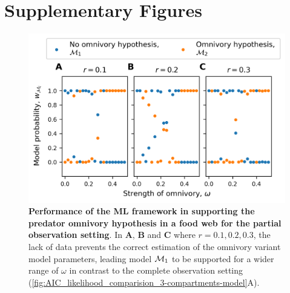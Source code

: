 \section{Supplementary Figures}
\begin{figure}[ht]
    \centering
    \includegraphics[]{figures/SI/figure5_2sp.png}
    \caption{\textbf{Performance of the ML framework in supporting the predator omnivory hypothesis in a food web for the partial observation setting}. 
    In \textbf{A},  \textbf{B} and \textbf{C} where $r = 0.1, 0.2 ,0.3$, the lack of data prevents the correct estimation of the omnivory variant model parameters, leading model $\mathcal{M}_1$ to be supported for a wider range of $\omega$ in contrast to the complete observation setting (\cref{fig:AIC_likelihood_comparision_3-compartments-model}A).}
    \label{figSI:model_selection_1sp}
\end{figure}

\FloatBarrier

